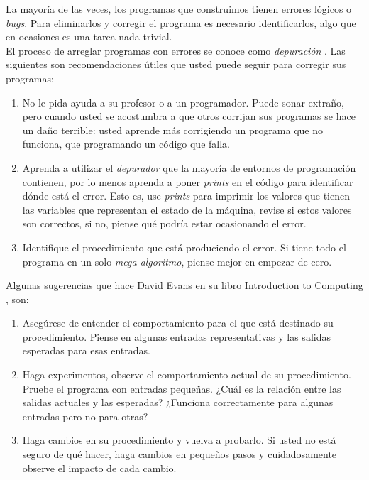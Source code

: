 La mayoría de las veces, los programas que construimos tienen errores lógicos o \emph{bugs}. Para eliminarlos y corregir el programa es necesario identificarlos, algo que en ocasiones es una tarea nada trivial. \\

El proceso de arreglar programas con errores se conoce como \emph{depuración} \cite{evansIntro}. Las siguientes son recomendaciones útiles que usted puede seguir para corregir sus programas:

\begin{enumerate}
	\item No le pida ayuda a su profesor o a un programador. Puede sonar extraño, pero cuando usted se acostumbra a que otros corrijan sus programas se hace un daño terrible: usted aprende más corrigiendo un programa que no funciona, que programando un código que falla. 
	
	\item Aprenda a utilizar el \emph{depurador} que la mayoría de entornos de programación contienen, por lo menos aprenda a poner \emph{prints} en el código para identificar dónde está el error. Esto es, use \emph{prints} para imprimir los valores que tienen las variables que representan el estado de la máquina, revise si estos valores son correctos, si no, piense qué podría estar ocasionando el error.
	
	\item Identifique el procedimiento que está produciendo el error. Si tiene todo el programa en un solo \emph{mega-algoritmo}, piense mejor en empezar de cero.
\end{enumerate}

Algunas sugerencias que hace David Evans en su libro Introduction to Computing \cite{evansIntro}, son:

\begin{enumerate}
	\item Asegúrese de entender el comportamiento para el que está destinado su procedimiento. Piense en algunas entradas representativas y las salidas esperadas para esas entradas.
	
	\item Haga experimentos, observe el comportamiento actual de su procedimiento. Pruebe el programa con entradas pequeñas. ¿Cuál es la relación entre las salidas actuales y las esperadas? ¿Funciona correctamente para algunas entradas pero no para otras? 

	\item Haga cambios en su procedimiento y vuelva a probarlo. Si usted no está seguro de qué hacer, haga cambios en pequeños pasos y cuidadosamente observe el impacto de cada cambio.
\end{enumerate}

